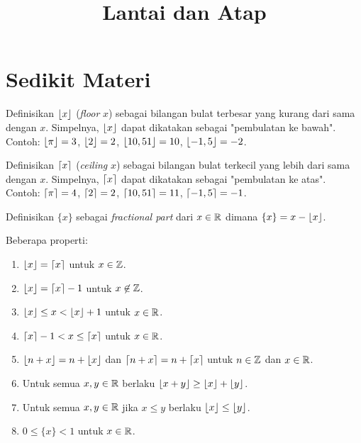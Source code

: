 \documentclass[11pt]{scrartcl}
\title{Lantai dan Atap}
\begin{document}
\maketitle
\section{Sedikit Materi}
Definisikan $\left\lfloor x \right\rfloor$ (\textit{floor} $x$) sebagai bilangan bulat terbesar yang kurang dari sama dengan $x$. Simpelnya, $\left\lfloor x \right\rfloor$ dapat dikatakan sebagai "pembulatan ke bawah". Contoh: $\left\lfloor \pi \right\rfloor=3$, $\left\lfloor 2 \right\rfloor=2$, $\left\lfloor 10,51 \right\rfloor=10$, $\left\lfloor -1,5 \right\rfloor=-2$.

Definisikan $\left\lceil x \right\rceil$ (\textit{ceiling} $x$) sebagai bilangan bulat terkecil yang lebih dari sama dengan $x$. Simpelnya, $\left\lceil x \right\rceil$ dapat dikatakan sebagai "pembulatan ke atas". Contoh: $\left\lceil \pi \right\rceil=4$, $\left\lceil 2 \right\rceil=2$, $\left\lceil 10,51 \right\rceil=11$, $\left\lceil -1,5 \right\rceil=-1$.

Definisikan $\{x\}$ sebagai \textit{fractional part} dari $x \in \mathbb R$ dimana $\{x\} = x - \left\lfloor x \right\rfloor$.

Beberapa properti:
\begin{enumerate}
    \item $\left\lfloor x \right\rfloor=\left\lceil x \right\rceil$ untuk $x \in \mathbb Z$.
    \item $\left\lfloor x \right\rfloor=\left\lceil x \right\rceil-1$ untuk $x \not \in \mathbb Z$.
    \item $\left\lfloor x \right\rfloor \le  x < \left\lfloor x \right\rfloor+1$ untuk $x \in \mathbb R$.
    \item $\left\lceil x \right\rceil-1 < x \le \left\lceil x \right\rceil$ untuk $x \in \mathbb R$.
    \item $\left\lfloor n+x \right\rfloor=n+\left\lfloor x \right\rfloor$ dan $\left\lceil n+x \right\rceil=n+\left\lceil x \right\rceil$ untuk $n\in \mathbb Z$ dan $x \in \mathbb R$.
    \item Untuk semua $x,y \in \mathbb R$ berlaku $\left\lfloor x+y \right\rfloor \ge \left\lfloor x \right\rfloor+\left\lfloor y \right\rfloor$.
    \item Untuk semua $x,y \in \mathbb R$ jika $x \le y$ berlaku $\left\lfloor x \right\rfloor \le \left\lfloor y \right\rfloor$.
    \item $0 \le \{x\} < 1$ untuk $x \in \mathbb R$.
\end{enumerate}
\end{document}

